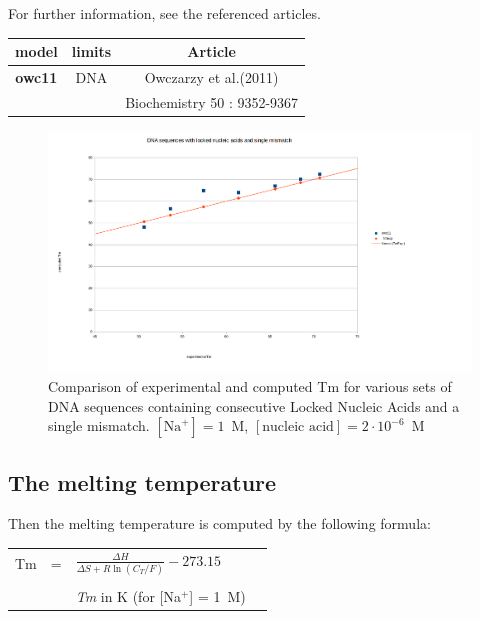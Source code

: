 \documentclass{article}
\begin{document}
For further information, see the referenced articles.

\begin{table}[hc]
\begin{tabular}[h]{| c | c | c |}
\textbf{model} & \textbf{limits} & \textbf{Article} \\
\hline
\textbf{owc11} & DNA & Owczarzy et al.(2011)\\
 & & Biochemistry 50 : 9352-9367\\
\hline
\end{tabular}
\end{table}

\begin{figure}[h]
\includegraphics[width=1\linewidth]{images/SingleMismatchLockedNucleicAcid}
\caption{Comparison of experimental and computed Tm for various sets of
 DNA sequences containing consecutive Locked Nucleic Acids and a single mismatch. $[\mbox{Na}^+] = 1$~M, $[\mbox{nucleic acid}] = 2\cdot{}10^{-6}$~M}
\end{figure}
 \pagebreak
 
\subsection{The melting temperature }  

Then the melting temperature is computed by the following formula: 
 
 

\begin{tabular}[h]{rcp{1.6in}p{2.2in}}
Tm & = & \begin{math} \frac{\Delta{}H}{\Delta{}S + R \ln (C_T/F)} - 273.15 \end{math} \\
   &   &                                                                                                                                                \\
   &   & \footnotesize \textit{Tm} in K (for [Na$^+$] = 1~M)
\end{tabular}
\end{document}
